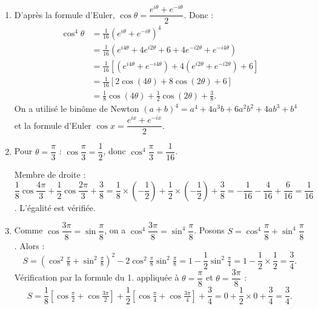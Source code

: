 \documentclass[11pt]{article}
\begin{document}
\begin{corrige}
\begin{enumerate}
\item D'après la formule d'Euler, $\cos\theta = \dfrac{e^{i\theta} + e^{-i\theta}}{2}$. Donc :
\begin{align*}
\cos^4\theta &= \frac{1}{16}\left(e^{i\theta} + e^{-i\theta}\right)^4 \\
&= \frac{1}{16}\left(e^{i4\theta} + 4e^{i2\theta} + 6 + 4e^{-i2\theta} + e^{-i4\theta}\right) \\
&= \frac{1}{16}\left[\left(e^{i4\theta} + e^{-i4\theta}\right) + 4\left(e^{i2\theta} + e^{-i2\theta}\right) + 6\right] \\
&= \frac{1}{16}\left[2\cos(4\theta) + 8\cos(2\theta) + 6\right] \\
&= \frac{1}{8}\cos(4\theta) + \frac{1}{2}\cos(2\theta) + \frac{3}{8}.
\end{align*}
On a utilisé le binôme de Newton $(a+b)^4 = a^4 + 4a^3b + 6a^2b^2 + 4ab^3 + b^4$ et la formule d'Euler $\cos x = \dfrac{e^{ix} + e^{-ix}}{2}$.
\item Pour $\theta = \dfrac{\pi}{3}$ : $\cos\dfrac{\pi}{3} = \dfrac{1}{2}$, donc $\cos^4\dfrac{\pi}{3} = \dfrac{1}{16}$.

Membre de droite : $\dfrac{1}{8}\cos\dfrac{4\pi}{3} + \dfrac{1}{2}\cos\dfrac{2\pi}{3} + \dfrac{3}{8} = \dfrac{1}{8}\times\left(-\dfrac{1}{2}\right) + \dfrac{1}{2}\times\left(-\dfrac{1}{2}\right) + \dfrac{3}{8} = -\dfrac{1}{16} - \dfrac{4}{16} + \dfrac{6}{16} = \dfrac{1}{16}$. L'égalité est vérifiée.
\item Comme $\cos\dfrac{3\pi}{8} = \sin\dfrac{\pi}{8}$, on a $\cos^4\dfrac{3\pi}{8} = \sin^4\dfrac{\pi}{8}$. Posons $S = \cos^4\dfrac{\pi}{8} + \sin^4\dfrac{\pi}{8}$. Alors :
\[ S = \left(\cos^2\tfrac{\pi}{8} + \sin^2\tfrac{\pi}{8}\right)^2 - 2\cos^2\tfrac{\pi}{8}\sin^2\tfrac{\pi}{8} = 1 - \frac{1}{2}\sin^2\tfrac{\pi}{4} = 1 - \frac{1}{2}\times\frac{1}{2} = \frac{3}{4}. \]
Vérification par la formule du 1. appliquée à $\theta = \dfrac{\pi}{8}$ et $\theta = \dfrac{3\pi}{8}$ :
\[ S = \frac{1}{8}\left[\cos\tfrac{\pi}{2} + \cos\tfrac{3\pi}{2}\right] + \frac{1}{2}\left[\cos\tfrac{\pi}{4} + \cos\tfrac{3\pi}{4}\right] + \frac{3}{4} = 0 + \frac{1}{2}\times 0 + \frac{3}{4} = \frac{3}{4}. \]
\end{enumerate}
\end{corrige}
\end{document}
